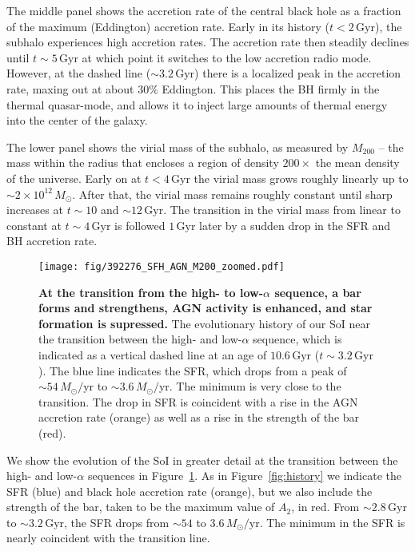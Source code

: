 \documentclass[linenumbers, twocolumn]{aastex631}
\newcommand{\Msun}{\ensuremath{M_{\odot}}}
\newcommand{\Gyr}{\ensuremath{\textrm{Gyr}}}
\newcommand{\Msunyr}{\ensuremath{\Msun/\textrm{yr}}}
\begin{document}
The middle panel shows the accretion rate of the central black hole as a fraction of the maximum (Eddington) accretion rate. Early in its history ($t<2\,\Gyr$), the subhalo experiences high accretion rates. The accretion rate then steadily declines until $t\sim5\,\Gyr$ at which point it switches to the low accretion radio mode. However, at the dashed line ($\sim3.2\,\Gyr$) there is a localized peak in the accretion rate, maxing out at about $30\%$ Eddington. This places the BH firmly in the thermal quasar-mode, and allows it to inject large amounts of thermal energy into the center of the galaxy.

The lower panel shows the virial mass of the subhalo, as measured by $M_{200}$ -- the mass within the radius that encloses a region of density $200\times$ the mean density of the universe. Early on at $t<4\,\Gyr$ the virial mass grows roughly linearly up to $\sim2\times10^{12}\,\Msun$. After that, the virial mass remains roughly constant until sharp increases at $t\sim10$ and $\sim12\,\Gyr$. The transition in the virial mass from linear to constant at $t\sim4\,\Gyr$ is followed $1\,\Gyr$ later by a sudden drop in the SFR and BH accretion rate.

\begin{figure}
  \centering
  \texttt{[image: fig/392276\_SFH\_AGN\_M200\_zoomed.pdf]}
  \caption{\textbf{At the transition from the high- to low-$\alpha$ sequence, a bar forms and strengthens, AGN activity is enhanced, and star formation is supressed.} The evolutionary history of our SoI near the transition between the high- and low-$\alpha$ sequence, which is indicated as a vertical dashed line at an age of $10.6\,\Gyr$ ($t\sim3.2\,\Gyr$). The blue line indicates the SFR, which drops from a peak of $\sim54\,\Msunyr$ to $\sim3.6\,\Msunyr$. The minimum is very close to the transition. The drop in SFR is coincident with a rise in the AGN accretion rate (orange) as well as a rise in the strength of the bar (red).}
  \label{fig:history_zoom}
\end{figure}

We show the evolution of the SoI in greater detail at the transition between the high- and low-$\alpha$ sequences in Figure~\ref{fig:history_zoom}. As in Figure~\ref{fig:history} we indicate the SFR (blue) and black hole accretion rate (orange), but we also include the strength of the bar, taken to be the maximum value of $A_2$, in red. From $\sim2.8\,\Gyr$ to $\sim3.2\,\Gyr$, the SFR drops from $\sim54$ to $3.6\,\Msunyr$. The minimum in the SFR is nearly coincident with the transition line.
\end{document}
